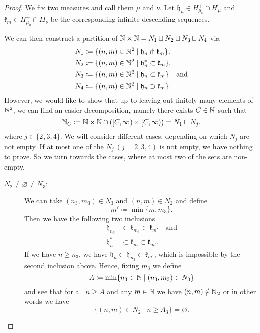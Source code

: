 \begin{proof}
  We fix two measures and call them \(\mu\) and \(\nu\). Let \(\mathfrak{h}_n \in H_{\mu_0}^+ \cap H_\mu\) and \(\mathfrak{k}_m \in H_{\mu_0}^+ \cap H_\nu\) be the corresponding infinite descending sequences.

  We can then construct a partition of \(\mathbb{N} \times \mathbb{N} = N_1 \sqcup N_2 \sqcup N_3 \sqcup N_4\) via
  \begin{align*}
    N_1 & \coloneqq \{(n,m) \in \mathbb{N}^2 \mid \mathfrak{h}_n \pitchfork \mathfrak{k}_m\},\\
    N_2 & \coloneqq \{(n,m) \in \mathbb{N}^2 \mid \mathfrak{h}_n^\ast \subset \mathfrak{k}_m\},\\
    N_3 & \coloneqq \{(n,m) \in \mathbb{N}^2 \mid \mathfrak{h}_n \subset \mathfrak{k}_m\}\quad \text{and}\\
    N_4 & \coloneqq \{(n,m) \in \mathbb{N}^2 \mid \mathfrak{h}_n \supset \mathfrak{k}_m\}.
  \end{align*}
  However, we would like to show that up to leaving out finitely many elements of \(\mathbb{N}^2\), we can find an easier decomposition, namely there exists \(C \in \mathbb{N}\) such that
  \[
    \mathbb{N}_C \coloneqq \mathbb{N} \times \mathbb{N} \cap ([C, \infty) \times [C, \infty)) = N_1 \sqcup N_j,
  \]
  where \(j \in \{2,3,4\}\). We will consider different cases, depending on which \(N_j\) are not empty. If at most one of the \(N_j\ (j = 2,3,4)\)  is not empty, we have nothing to prove. So we turn towards the cases, where at most two of the sets are non-empty.
  \begin{description}
  \item[\(N_2 \neq \varnothing \neq N_3\):] We can take \((n_3, m_3) \in N_3\) and \((n,m) \in N_2\) and define
    \[
      m' \coloneqq \min\{m, m_3\}.
    \]
    Then we have the following two inclusions
    \begin{align*}
      \mathfrak{h}_{n_3} & \subset \mathfrak{k}_{m_3} \subset \mathfrak{k}_{m'} \quad \text{and}\\
      \mathfrak{h}_{n}^\ast & \subset \mathfrak{k}_m \subset \mathfrak{k}_{m'}.
    \end{align*}
    If we have \(n \geq n_3\), we have \(\mathfrak{h}_n \subset \mathfrak{h}_{n_3} \subset \mathfrak{k}_{m'}\), which is impossible by the second inclusion above. Hence, fixing \(m_3\) we define
    \[
      A \coloneqq \min \{n_3 \in \mathbb{N} \mid (n_3, m_3) \in N_3\}
    \]
    and see that for all \(n \geq A\) and any \(m \in \mathbb{N}\) we have \((n,m) \notin \mathbb{N}_2\) or in other words we have
    \[
      \{(n,m) \in N_2 \mid n \geq A_3\} = \varnothing.
\]
\end{description}
\end{proof}
